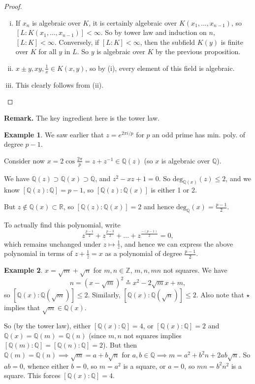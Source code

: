 \documentclass{article}
\theoremstyle{definition}
\newtheorem{example}{Example}[section]
\begin{document}
\begin{proof}
    \begin{enumerate}[(i)]
        \item If $x_n$ is algebraic over $K$, it is certainly algebraic over $K(x_1,\ldots,x_{n-1})$, so $[L : K(x_1,\ldots,x_{n-1})] < \infty$. So by tower law and induction on $n$, $[L:K] < \infty$. Conversely, if $[L:K] < \infty$, then the subfield $K(y)$ is finite over $K$ for all $y$ in $L$. So $y$ is algebraic over $K$ by the previous proposition.
        \item $x \pm y, xy, \frac{1}{x} \in K(x,y)$, so by (i), every element of this field is algebraic.
        \item This clearly follows from (ii).
    \end{enumerate}
\end{proof}
\textbf{Remark.} The key ingredient here is the tower law.


\begin{example}
We saw earlier that $z = e^{2 \pi i /p}$ for $p$ an odd prime has min. poly. of degree $p-1$.

Consider now $x = 2\cos\frac{2\pi}{p} = z + z^{-1} \in \mathbb{Q}(z)$ (so $x$ is algebraic over $\mathbb{Q}$).

We have $\mathbb{Q}(z) \supset \mathbb{Q}(x) \supset \mathbb{Q}$, and $z^2-xz+1 = 0$. So $\text{deg}_{\mathbb{Q}(x)}(z) \le 2$, and we know $[\mathbb{Q}(z) : \mathbb{Q}] = p-1$, so $[\mathbb{Q}(z) : \mathbb{Q}(x)]$ is either 1 or 2.

But $z \not\in \mathbb{Q}(x) \subset \mathbb{R}$, so $[\mathbb{Q}(z) : \mathbb{Q}(x)] = 2$ and hence $\text{deg}_{\mathbb{Q}}(x) = \frac{p-1}{2}$.

To actually find this polynomial, write $$z^{\frac{p-1}{2}}+z^{\frac{p-3}{2}} + \ldots + z^{\frac{-(p-1)}{2}} = 0,$$ which remains unchanged under $z \mapsto \frac{1}{z}$, and hence we can express the above polynomial in terms of $z + \frac{1}{z} = x$ as a polynomial of degree $\frac{p-1}{2}$.
\end{example}
\begin{example}
    $x = \sqrt{m} + \sqrt{n}$ for $m,n \in \mathbb{Z}$, $m,n,mn$ not squares. We have \[
    n = (x - \sqrt{m})^2 \stackrel{\star}{=}  x^2 - 2\sqrt{m}x + m
    ,\] so $[\mathbb{Q}(x) : \mathbb{Q}(\sqrt{m})] \le 2$. Similarly, $[\mathbb{Q}(x) : \mathbb{Q}(\sqrt{n})] \le 2$. Also note that $\star$ implies that $\sqrt{m} \in \mathbb{Q}(x)$.

    So (by the tower law), either $[\mathbb{Q}(x):\mathbb{Q}]=4$, or $[\mathbb{Q}(x):\mathbb{Q}]=2$ and $\mathbb{Q}(x)=\mathbb{Q}(m)=\mathbb{Q}(n)$ (since $m,n$ not squares implies $[\mathbb{Q}(m): \mathbb{Q}] = [\mathbb{Q}(n): \mathbb{Q}] = 2$). But then $\mathbb{Q}(m)=\mathbb{Q}(n) \implies \sqrt{m}=a+b\sqrt{n}$ for $a,b \in \mathbb{Q} \implies m = a^2 + b^2 n + 2ab \sqrt{n}$. So $ab=0$, whence either $b=0$, so $m=a^2$ is a square, or $a=0$, so $mn=b^2n^2$ is a square. This forces $[\mathbb{Q}(x): \mathbb{Q}] = 4$.
\end{example}
\end{document}
